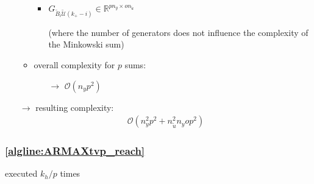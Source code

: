\documentclass{article}
\begin{document}
\begin{itemize}
\begin{itemize}
\begin{itemize}
            \item $G_{\tilde{B}_{i} \tilde{\mathcal{U}}(k_+-i)} \in \mathbb{R}^{pn_y \times on_{\tilde{u}}}$ 
            \item[] (where the number of generators does not influence the complexity of the Minkowski sum)
        \end{itemize}
        \item overall complexity for $p$ sums:%
        \begin{itemize}
            \item[$\rightarrow$] $\mathcal{O}(n_y p^2)$
        \end{itemize}
    \end{itemize}    
    \item[$\rightarrow$] resulting complexity: \begin{align*}
        \mathcal{O}(n_y^2 p^2 + n_{\tilde{u}}^2 n_y o p^2)
    \end{align*}
\end{itemize}


\subsubsection{\cref{algline:ARMAXtvp_reach}} \label{sec:line7}
executed $k_h/p$ times
\end{document}
